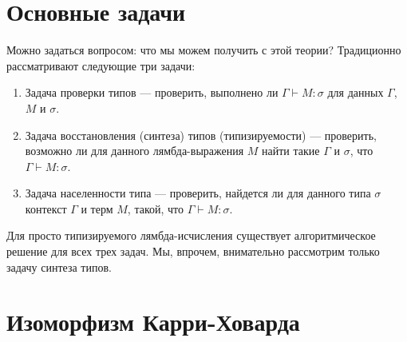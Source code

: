 \section{Основные задачи}

Можно задаться вопросом: что мы можем получить с этой теории?
Традиционно рассматривают следующие три задачи:

\begin{enumerate}
\item Задача проверки типов --- проверить, выполнено ли $\Gamma \vdash M:\sigma$ для
данных $\Gamma$, $M$ и $\sigma$.
\item Задача восстановления (синтеза) типов (типизируемости) --- проверить, возможно ли для
данного лямбда-выражения $M$ найти такие $\Gamma$ и $\sigma$, что $\Gamma \vdash M:\sigma$.
\item Задача населенности типа --- проверить, найдется ли для данного типа $\sigma$ контекст 
$\Gamma$ и терм $M$, такой, что $\Gamma \vdash M:\sigma$.
\end{enumerate}

Для просто типизируемого лямбда-исчисления существует алгоритмическое решение для всех
трех задач. Мы, впрочем, внимательно рассмотрим только задачу синтеза типов.






\section{Изоморфизм Карри-Ховарда}


